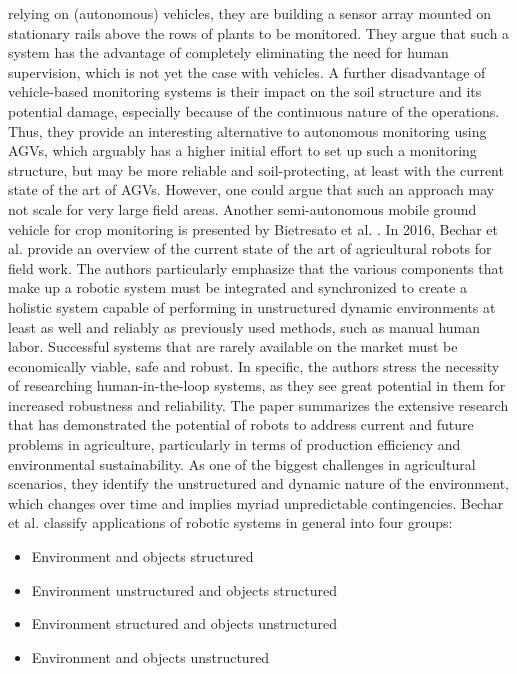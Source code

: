 \documentclass[english, master, utf8]{base/thesis_KBS}
\begin{document}
relying on (autonomous) vehicles, they are building a sensor array mounted on stationary rails above the rows of plants to be monitored. They argue that such a system has the
advantage of completely eliminating the need for human supervision, which is not yet the case with vehicles. A further disadvantage of vehicle-based monitoring systems is their
impact on the soil structure and its potential damage, especially because of the continuous nature of the operations. \cite{Virlet:2016} Thus, they provide an interesting
alternative to autonomous monitoring using AGVs, which arguably has a higher initial effort to set up such a monitoring structure, but may be more reliable and soil-protecting,
at least with the current state of the art of AGVs. However, one could argue that such an approach may not scale for very large field areas.\newline 
Another semi-autonomous mobile ground vehicle for crop monitoring is presented by Bietresato et al. \cite{Bietresato:2016}.\newline
In 2016, Bechar et al. \cite{Bechar:2016} provide an overview of the current state of the art of agricultural robots for field work. The authors particularly emphasize that the various
components that make up a robotic system must be integrated and synchronized to create a holistic system capable of performing in unstructured dynamic environments at least as
well and reliably as previously used methods, such as manual human labor. Successful systems that are rarely available on the market must be economically viable, safe and robust.
\cite{Bechar:2016} In specific, the authors stress the necessity of researching human-in-the-loop systems, as they see great potential in them for increased robustness and
reliability. The paper summarizes the extensive research that has demonstrated the potential of robots to address current and future problems in agriculture, particularly in terms
of production efficiency and environmental sustainability. As one of the biggest challenges in agricultural scenarios, they identify the unstructured and dynamic nature of the
environment, which changes over time and implies myriad unpredictable contingencies. Bechar et al. classify applications of robotic systems in general into four groups:
\begin{itemize}
    \item Environment and objects structured
    \item Environment unstructured and objects structured
    \item Environment structured and objects unstructured
    \item Environment and objects unstructured
\end{itemize}
\end{document}
